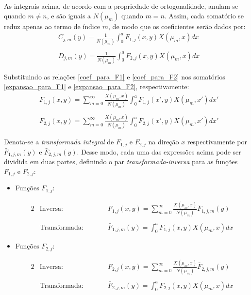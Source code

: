 As integrais acima, de acordo com a propriedade de ortogonalidade, anulam-se quando $m \ne n$, e são iguais a $N(\mu_m)$ quando $m = n$. Assim, cada somatório se reduz apenas ao
termo de índice $m$, de modo que os coeficientes serão dados por:
\begin{align}
& C_{j,m}(y) = \frac{1}{N(\mu_m)}\int_0^a F_{1, j}(x, y)X(\mu_m, x)dx \label{coef_para_F1}\\ \nonumber \\
& D_{j,m}(y) = \frac{1}{N(\mu_m)}\int_0^a F_{2, j}(x, y)X(\mu_m, x)dx \label{coef_para_F2}
\end{align}

Substituindo as relações \eqref{coef_para_F1} e \eqref{coef_para_F2} nos somatórios \eqref{expansao_para_F1} e \eqref{expansao_para_F2}, respectivamente:
\begin{align}
& F_{1, j}(x, y) = \sum_{m=0}^\infty \frac{X(\mu_m, x)}{N(\mu_m)}\int_0^a F_{1, j}(x', y)X(\mu_m, x')dx' \label{expansao_para_F1_nova}\\ \nonumber \\
& F_{2, j}(x, y) = \sum_{m=0}^\infty \frac{X(\mu_m, x)}{N(\mu_m)}\int_0^a F_{2, j}(x', y)X(\mu_m, x')dx' \label{expansao_para_F2_nova}
\end{align}

Denota-se a \textit{transformada integral} de $F_{1, j}$ e $F_{2, j}$ na direção $x$ respectivamente por $\bar{F}_{1,j,m}(y)$ e $\bar{F}_{2,j,m}(y)$.
Desse modo, cada uma das expressões acima pode ser dividida em duas partes, definindo o par \textit{transformada-inversa} para as funções $F_{1,j}$ e $F_{2,j}$:
\begin{itemize}
	\item Funções $F_{1, j}$:
	\begin{fleqn}
		\begin{alignat}{2}
		& \text{Inversa:} && F_{1, j}(x, y) = \sum_{m=0}^\infty \frac{X(\mu_m, x)}{N(\mu_m)}\bar{F}_{1,j,m}(y) \label{definicao_da_transf_inv_F1} \\ \nonumber \\
		& \text{Transformada:} \quad\quad && \bar{F}_{1,j,m}(y) = \int_0^a F_{1, j}(x, y) X(\mu_m, x) dx \label{definicao_da_transf_F1}
		\end{alignat}
	\end{fleqn}
	\item Funções $F_{2, j}$:
	\begin{fleqn}
		\begin{alignat}{2}
		& \text{Inversa:} && F_{2, j}(x, y) = \sum_{m=0}^\infty \frac{X(\mu_m, x)}{N(\mu_m)}\bar{F}_{2,j,m}(y) \label{definicao_da_transf_inv_F2} \\ \nonumber \\
		& \text{Transformada:} \quad\quad && \bar{F}_{2,j,m}(y) = \int_0^a F_{2, j}(x, y) X(\mu_m, x) dx
		\label{definicao_da_transf_F2}
		\end{alignat}
	\end{fleqn}
\end{itemize}

